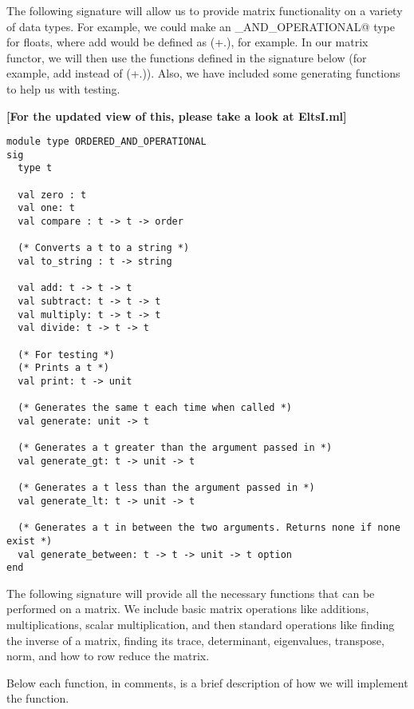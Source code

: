\documentclass[letterpaper,11pt]{article}
\newcommand{\annot}[1]{\textbf{\color{BrickRed} [#1]}}
\begin{document}
The following signature will allow us to provide matrix functionality on a
variety of data types. For example, we could make an
\verb@ORDERED_AND_OPERATIONAL@ type for floats, where add would be defined as
(+.), for example. In our matrix functor, we will then use the functions defined
in the signature below (for example, add instead of (+.)). Also, we have
included some generating functions to help us with testing. 

{\annot{For the updated view of this, please take a look at EltsI.ml}}
\begin{verbatim}
module type ORDERED_AND_OPERATIONAL
sig
  type t

  val zero : t
  val one: t
  val compare : t -> t -> order

  (* Converts a t to a string *)
  val to_string : t -> string

  val add: t -> t -> t
  val subtract: t -> t -> t
  val multiply: t -> t -> t
  val divide: t -> t -> t

  (* For testing *)
  (* Prints a t *)
  val print: t -> unit 

  (* Generates the same t each time when called *)
  val generate: unit -> t

  (* Generates a t greater than the argument passed in *)
  val generate_gt: t -> unit -> t

  (* Generates a t less than the argument passed in *)
  val generate_lt: t -> unit -> t

  (* Generates a t in between the two arguments. Returns none if none exist *)
  val generate_between: t -> t -> unit -> t option
end
\end{verbatim}

The following signature will provide all the necessary functions that can be
performed on a matrix. We include basic matrix operations like additions,
multiplications, scalar multiplication, and then standard operations like
finding the inverse of a matrix, finding its trace, determinant, eigenvalues,
transpose, norm, and how to row reduce the matrix. 

Below each function, in comments, is a brief description of how we will
implement the function. 
\end{document}
